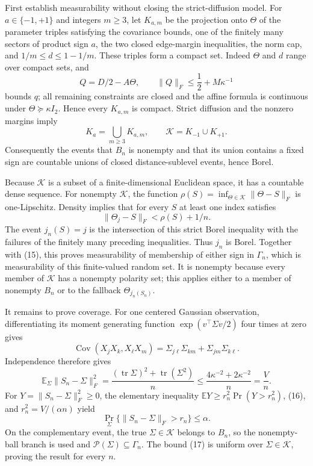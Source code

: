 First establish measurability without closing the strict-diffusion model.  For \(a\in\{-1,+1\}\) and integers \(m\ge3\), let \(K_{a,m}\) be the projection onto \(\Theta\) of the parameter triples satisfying the covariance bounds, one of the finitely many sectors of product sign \(a\), the two closed edge-margin inequalities, the norm cap, and \(1/m\le d\le1-1/m\).  These triples form a compact set.  Indeed \(\Theta\) and \(d\) range over compact sets, and
\[
 Q=D/2-A\Theta,\qquad
 \lVert Q\rVert_F\le\frac12+M\kappa^{-1}
\]
bounds \(q\); all remaining constraints are closed and the affine formula is continuous under \(\Theta\succeq\kappa I_2\).  Hence every \(K_{a,m}\) is compact.  Strict diffusion and the nonzero margins imply
\[
 K_a=\bigcup_{m\ge3}K_{a,m},\qquad
 \mathcal K=K_{-1}\cup K_{+1}. \tag{15}
\]
Consequently the events that \(B_n\) is nonempty and that its union contains a fixed sign are countable unions of closed distance-sublevel events, hence Borel.

Because \(\mathcal K\) is a subset of a finite-dimensional Euclidean space, it has a countable dense sequence.  For nonempty \(\mathcal K\), the function \(\rho(S)=\inf_{\Theta\in\mathcal K}\lVert\Theta-S\rVert_F\) is one-Lipschitz.  Density implies that for every \(S\) at least one index satisfies
\[
 \lVert\Theta_j-S\rVert_F<\rho(S)+1/n.
\]
The event \(j_n(S)=j\) is the intersection of this strict Borel inequality with the failures of the finitely many preceding inequalities.  Thus \(j_n\) is Borel.  Together with (15), this proves measurability of membership of either sign in \(\Gamma_n\), which is measurability of this finite-valued random set.  It is nonempty because every member of \(\mathcal K\) has a nonempty polarity set; this applies either to a member of nonempty \(B_n\) or to the fallback \(\Theta_{j_n(S_n)}\).

It remains to prove coverage.  For one centered Gaussian observation, differentiating its moment generating function \(\exp(v^{\top}\Sigma v/2)\) four times at zero gives
\[
 \operatorname{Cov}(X_jX_k,X_\ell X_m)
 =\Sigma_{j\ell}\Sigma_{km}+\Sigma_{jm}\Sigma_{k\ell}.
\]
Independence therefore gives
\[
 \mathbb E_{\Sigma}\lVert S_n-\Sigma\rVert_F^2
 =\frac{(\operatorname{tr}\Sigma)^2+\operatorname{tr}(\Sigma^2)}{n}
 \le\frac{4\kappa^{-2}+2\kappa^{-2}}n=\frac Vn. \tag{16}
\]
For \(Y=\lVert S_n-\Sigma\rVert_F^2\ge0\), the elementary inequality \(\mathbb E Y\ge r_n^2\Pr(Y>r_n^2)\), (16), and \(r_n^2=V/(\alpha n)\) yield
\[
 \Pr_{\Sigma}\{\lVert S_n-\Sigma\rVert_F>r_n\}\le\alpha. \tag{17}
\]
On the complementary event, the true \(\Sigma\in\mathcal K\) belongs to \(B_n\), so the nonempty-ball branch is used and \(\mathcal P(\Sigma)\subseteq\Gamma_n\).  The bound (17) is uniform over \(\Sigma\in\mathcal K\), proving the result for every \(n\).

